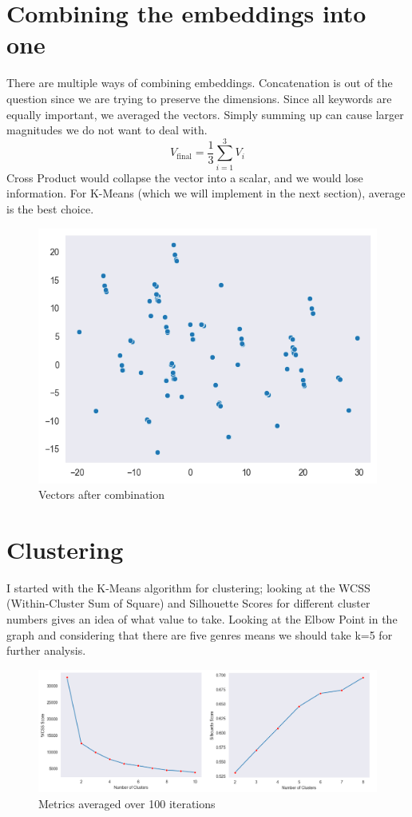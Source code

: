 \documentclass{article}
\begin{document}
\section{Combining the embeddings into one}
There are multiple ways of combining embeddings.
Concatenation is out of the question since we are trying to preserve the dimensions. Since all keywords are equally important, we averaged the vectors. Simply summing up can cause larger magnitudes we do not want to deal with.
\[
V_{\text{final}} = \frac{1}{3} \sum_{i=1}^{3} V_i
\]
Cross Product would collapse the vector into a scalar, and we would lose information. For K-Means (which we will implement in the next section), average is the best choice.
\begin{figure}[h]
    \centering
    \includegraphics[width=1\textwidth]{vecs.png} %
    \caption{Vectors after combination}
    \label{fig:vectors}
\end{figure}
\pagebreak
\section{Clustering}
I started with the K-Means algorithm for clustering; looking at the WCSS (Within-Cluster Sum of Square) and Silhouette Scores for different cluster numbers gives an idea of what value to take. Looking at the Elbow Point in the graph and considering that there are five genres means we should take k=5 for further analysis.
\begin{figure}[h]
    \centering
    \includegraphics[width=1\textwidth]{metrics.png}
    \caption{Metrics averaged over 100 iterations}
    \label{fig:metrics}
\end{figure}
\end{document}
